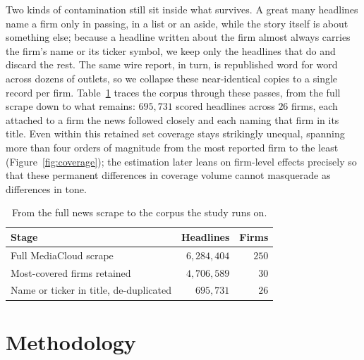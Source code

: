 \documentclass[conference]{IEEEtran}
\begin{document}
Two kinds of contamination still sit inside what survives. A great many headlines
name a firm only in passing, in a list or an aside, while the story itself is about
something else; because a headline written about the firm almost always carries the
firm's name or its ticker symbol, we keep only the headlines that do and discard the
rest. The same wire report, in turn, is republished word for word across dozens of
outlets, so we collapse these near-identical copies to a single record per firm.
Table~\ref{tab:funnel} traces the corpus through these passes, from the full scrape
down to what remains: $695{,}731$ scored headlines across $26$ firms, each attached
to a firm the news followed closely and each naming that firm in its title. Even
within this retained set coverage stays strikingly unequal, spanning more than four
orders of magnitude from the most reported firm to the least
(Figure~\ref{fig:coverage}); the estimation later leans on firm-level effects
precisely so that these permanent differences in coverage volume cannot masquerade
as differences in tone.

\begin{table}[!htb]
\caption{From the full news scrape to the corpus the study runs on.}
\label{tab:funnel}
\centering
\small
\begin{tabular}{lrr}
\toprule
Stage & Headlines & Firms \\
\midrule
Full MediaCloud scrape & $6{,}284{,}404$ & $250$ \\
Most-covered firms retained & $4{,}706{,}589$ & $30$ \\
Name or ticker in title, de-duplicated & $695{,}731$ & $26$ \\
\bottomrule
\end{tabular}
\end{table}

\section{Methodology}

\end{document}
